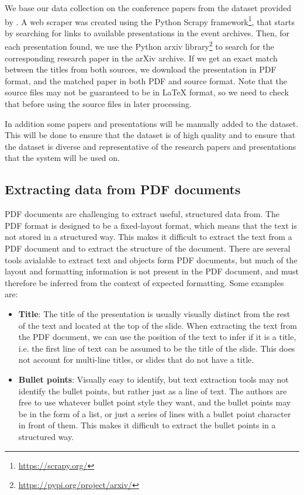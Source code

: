 We base our data collection on the conference papers from the dataset provided by \citet{Fu:2022:AAAI}. A web scraper was created using the Python Scrapy framework\footnote{\url{https://scrapy.org/}}, that starts by searching for links to available presentations in the event archives. Then, for each presentation found, we use the Python arxiv library\footnote{\url{https://pypi.org/project/arxiv/}} to search for the corresponding research paper in the arXiv archive. If we get an exact match between the titles from both sources, we download the presentation in PDF format, and the matched paper in both PDF and source format. Note that the source files may not be guaranteed to be in \LaTeX{} format, so we need to check that before using the source files in later processing.

In addition some papers and presentations will be manually added to the dataset. This will be done to ensure that the dataset is of high quality and to ensure that the dataset is diverse and representative of the research papers and presentations that the system will be used on.

\subsection{Extracting data from PDF documents}
PDF documents are challenging to extract useful, structured data from. The PDF format is designed to be a fixed-layout format, which means that the text is not stored in a structured way. This makes it difficult to extract the text from a PDF document and to extract the structure of the document. There are several tools avialable to extract text and objects form PDF documents, but much of the layout and formatting information is not present in the PDF document, and must therefore be inferred from the context of expected formatting. Some examples are:

\begin{itemize}
    \item \textbf{Title}: The title of the presentation is usually visually distinct from the rest of the text and located at the top of the slide. When extracting the text from the PDF document, we can use the position of the text to infer if it is a title, i.e. the first line of text can be assumed to be the title of the slide. This does not account for multi-line titles, or slides that do not have a title.
    \item \textbf{Bullet points}: Visually easy to identify, but text extraction tools may not identify the bullet points, but rather just as a line of text. The authors are free to use whatever bullet point style they want, and the bullet points may be in the form of a list, or just a series of lines with a bullet point character in front of them. This makes it difficult to extract the bullet points in a structured way. 
\end{itemize}

